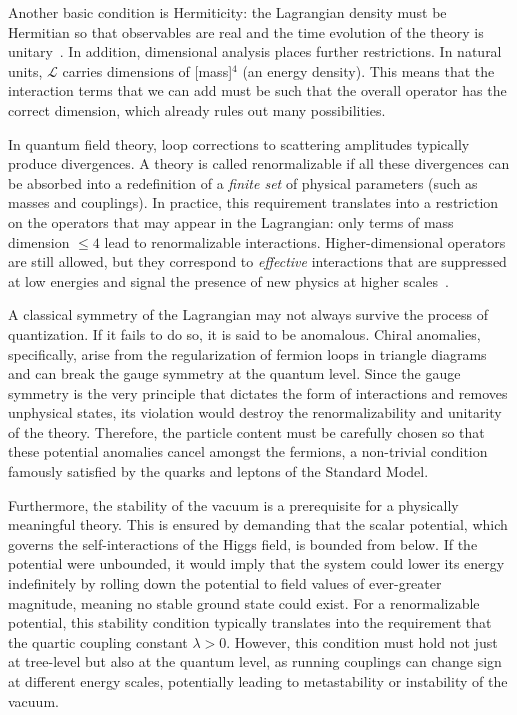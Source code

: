 Another basic condition is Hermiticity: the Lagrangian density must be Hermitian so that observables are real and the time evolution of the theory is unitary~\parencite{pall,peskin}. In addition, dimensional analysis places further restrictions. In natural units, $\mathcal{L}$ carries dimensions of [mass]$^4$ (an energy density). This means that the interaction terms that we can add must be such that the overall operator has the correct dimension, which already rules out many possibilities. 

In quantum field theory, loop corrections to scattering amplitudes typically produce divergences. A theory is called renormalizable if all these divergences can be absorbed into a redefinition of a \emph{finite set} of physical parameters (such as masses and couplings). In practice, this requirement translates into a restriction on the operators that may appear in the Lagrangian: only terms of mass dimension $\leq 4$ lead to renormalizable interactions. Higher-dimensional operators are still allowed, but they correspond to \emph{effective} interactions that are suppressed at low energies and signal the presence of new physics at higher scales~\parencite{peskin,Weinberg}. 

A classical symmetry of the Lagrangian may not always survive the process of quantization. If it fails to do so, it is said to be anomalous. Chiral anomalies, specifically, arise from the regularization of fermion loops in triangle diagrams and can break the gauge symmetry at the quantum level. Since the gauge symmetry is the very principle that dictates the form of interactions and removes unphysical states, its violation would destroy the renormalizability and unitarity of the theory. Therefore, the particle content must be carefully chosen so that these potential anomalies cancel amongst the fermions, a non-trivial condition famously satisfied by the quarks and leptons of the Standard Model.

Furthermore, the stability of the vacuum is a prerequisite for a physically meaningful theory. This is ensured by demanding that the scalar potential, which governs the self-interactions of the Higgs field, is bounded from below. If the potential were unbounded, it would imply that the system could lower its energy indefinitely by rolling down the potential to field values of ever-greater magnitude, meaning no stable ground state could exist. For a renormalizable potential, this stability condition typically translates into the requirement that the quartic coupling constant $\lambda > 0$. However, this condition must hold not just at tree-level but also at the quantum level, as running couplings can change sign at different energy scales, potentially leading to metastability or instability of the vacuum.


